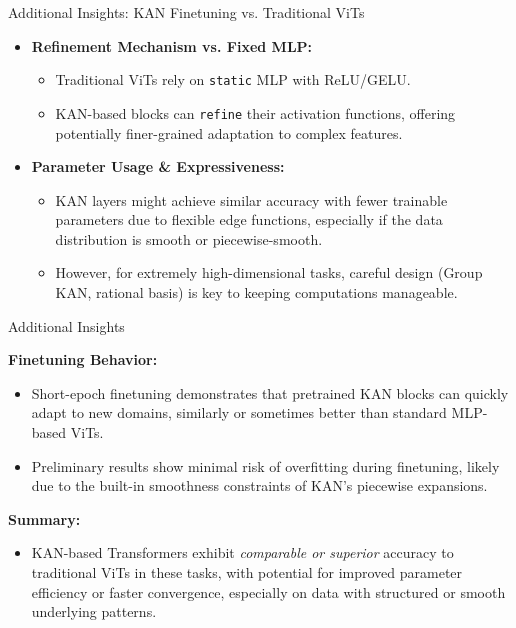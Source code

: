 \documentclass{beamer}
\begin{document}
\begin{frame}{Additional Insights: KAN Finetuning vs. Traditional ViTs}
    \begin{itemize}
        \item \textbf{Refinement Mechanism vs. Fixed MLP:}
              \begin{itemize}
                  \item Traditional ViTs rely on \texttt{static} MLP with ReLU/GELU.
                  \item KAN-based blocks can \texttt{refine} their activation functions, offering potentially finer-grained adaptation to complex features.
              \end{itemize}
        \item \textbf{Parameter Usage \& Expressiveness:}
              \begin{itemize}
                  \item KAN layers might achieve similar accuracy with fewer trainable parameters due to flexible edge functions, especially if the data distribution is smooth or piecewise-smooth.
                  \item However, for extremely high-dimensional tasks, careful design (Group KAN, rational basis) is key to keeping computations manageable.
              \end{itemize}

    \end{itemize}
\end{frame}

\begin{frame}{Additional Insights}
  \item \textbf{Finetuning Behavior:}
  \begin{itemize}
      \item Short-epoch finetuning demonstrates that pretrained KAN blocks can quickly adapt to new domains, similarly or sometimes better than standard MLP-based ViTs.
      \item Preliminary results show minimal risk of overfitting during finetuning, likely due to the built-in smoothness constraints of KAN's piecewise expansions.
  \end{itemize}
\item \textbf{Summary:}
  \begin{itemize}
      \item KAN-based Transformers exhibit \emph{comparable or superior} accuracy to traditional ViTs in these tasks, with potential for improved parameter efficiency or faster convergence, especially on data with structured or smooth underlying patterns.
  \end{itemize}
\end{frame}
\end{document}
